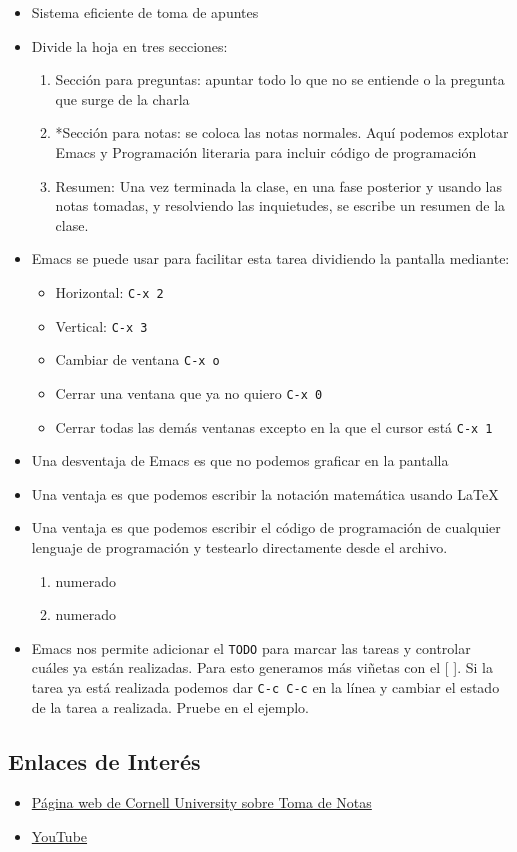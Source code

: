 \documentclass{article}
\begin{document}
\begin{itemize}
\item Sistema eficiente de toma de apuntes
\item Divide la hoja en tres secciones:
\begin{enumerate}
\item \alert{Sección para preguntas}: apuntar todo lo que no se entiende o la
pregunta que surge de la charla
\item *Sección para notas: se coloca las notas normales. Aquí podemos
explotar Emacs y Programación literaria para incluir código de programación
\item \alert{Resumen}: Una vez terminada la clase, en una fase posterior y
usando las notas tomadas, y resolviendo las inquietudes, se
escribe un resumen de la clase.
\end{enumerate}
\item Emacs se puede usar para facilitar esta tarea dividiendo la pantalla mediante:
\begin{itemize}
\item Horizontal: \texttt{C-x 2}
\item Vertical: \texttt{C-x 3}
\item Cambiar de ventana \texttt{C-x o}
\item Cerrar una ventana que ya no quiero \texttt{C-x 0}
\item Cerrar todas las demás ventanas excepto en la que el cursor está \texttt{C-x 1}
\end{itemize}
\item Una desventaja de Emacs es que no podemos graficar en la pantalla
\item Una ventaja es que podemos escribir la notación matemática usando \LaTeX
\item Una ventaja es que podemos escribir el código de programación de
cualquier lenguaje de programación y testearlo directamente desde el archivo.
\begin{enumerate}
\item numerado
\item numerado
\end{enumerate}
\item Emacs nos permite adicionar el \texttt{TODO} para marcar las tareas y
controlar cuáles ya están realizadas. Para esto generamos más
viñetas con el [ ]. Si la tarea ya está realizada podemos dar \texttt{C-c
  C-c} en la línea y cambiar el estado de la tarea a realizada. Pruebe
en el ejemplo.
\end{itemize}
\subsection{Enlaces de Interés}
\label{sec:orgaeb6bb9}
\begin{itemize}
\item \href{https://lsc.cornell.edu/how-to-study/taking-notes/cornell-note-taking-system/}{Página web de Cornell University sobre Toma de Notas}
\item \href{https://youtu.be/nX-xshA\_0m8?si=20MELdipZ1cjRh2f}{YouTube}
\end{itemize}
\end{document}

